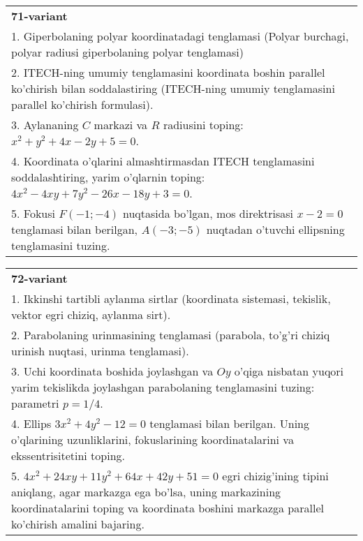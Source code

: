 \documentclass{article}
\begin{document}
\begin{tabular}{m{17cm}}
\textbf{71-variant}\\
1. Giperbolaning polyar koordinatadagi tenglamasi (Polyar burchagi, polyar radiusi giperbolaning polyar tenglamasi)\\

2. ITECH-ning umumiy tenglamasini koordinata boshin parallel ko'chirish bilan soddalastiring (ITECH-ning umumiy tenglamasini parallel ko'chirish formulasi).\\

3. Aylananing $C$ markazi va $R$ radiusini toping: $x^2+y^2+4x-2y+5=0$.\\

4. Koordinata o'qlarini almashtirmasdan ITECH tenglamasini soddalashtiring, yarim o'qlarnin toping: $4x^{2} - 4xy + 7y^{2} - 26x - 18y + 3 = 0$.\\

5. Fokusi $F( - 1; - 4)$ nuqtasida bo'lgan, mos direktrisasi $x - 2 = 0$ tenglamasi bilan berilgan, $A( - 3; - 5)$ nuqtadan o'tuvchi ellipsning tenglamasini tuzing.  
\end{tabular}
\vspace{1cm}


\begin{tabular}{m{17cm}}
\textbf{72-variant}\\
1. Ikkinshi tartibli aylanma sirtlar (koordinata sistemasi, tekislik, vektor egri chiziq, aylanma sirt).\\

2. Parabolaning urinmasining tenglamasi (parabola, to'g'ri chiziq urinish nuqtasi, urinma tenglamasi).\\

3. Uchi koordinata boshida joylashgan va $Oy$ o'qiga nisbatan yuqori yarim tekislikda joylashgan parabolaning tenglamasini tuzing: parametri $p=1/4$.\\

4. Ellips $3x^{2} + 4y^{2} - 12 = 0$ tenglamasi bilan berilgan. Uning o'qlarining uzunliklarini, fokuslarining koordinatalarini va ekssentrisitetini toping.  \\

5. $4x^{2} + 24xy + 11y^{2} + 64x + 42y + 51 = 0$ egri chizig'ining tipini aniqlang, agar markazga ega bo'lsa, uning markazining koordinatalarini toping va koordinata boshini markazga parallel ko'chirish amalini bajaring.
\end{tabular}
\vspace{1cm}
\end{document}
